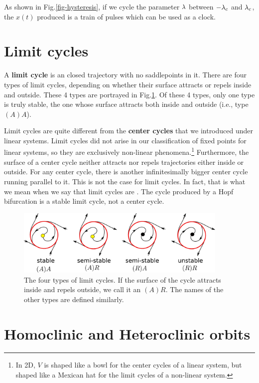  As shown in Fig.\ref{fig-hysteresis},
 if we cycle the parameter $\lambda$
 between $-\lambda_c$ and 
 $\lambda_c$, the $x(t)$ produced is a
 train of pulses
 which can be used as a clock.
 


\section{Limit cycles}

A {\bf limit cycle} is an  closed trajectory with no saddlepoints
 in it. There are four types of limit cycles, depending on whether their surface attracts or repels inside and outside.
 These 4 types are portrayed  in Fig.\ref{fig-limit-cycles}. Of these 4 types, only one type
 is truly stable,  the one whose surface attracts both inside and outside (i.e., type $(A)A$).
 
 Limit cycles are quite different from the {\bf center cycles} that we introduced under linear systems.
 Limit cycles did not arise in our classification of fixed points for linear systems, so they are exclusively non-linear phenomena.\footnote{
 In 2D, $V$ is shaped like a bowl for the center cycles of a linear system, but
 shaped like a
 Mexican hat for the limit cycles
 of a non-linear system.} Furthermore, 
 the surface of a center cycle neither attracts
 nor repels trajectories either inside
 or outside. For any center cycle, 
 there is another infinitesimally bigger
 center cycle  running parallel to it.
 This is not the case for limit cycles.
 In fact, that is what we mean when we say  
 that limit cycles are 
 . The cycle produced 
 by a Hopf bifurcation is a stable limit cycle, not a center cycle.
 

\begin{figure}[h!]
\centering
\includegraphics[width=4in]
{dynamical-sys/limit-cycles.png}
\caption{The four types of limit cycles. If the 
surface of the cycle attracts inside and repels outside,
we call it an $(A)R$. The names of the other types
are defined similarly. }
\label{fig-limit-cycles}
\end{figure}

\section{Homoclinic and Heteroclinic orbits}

